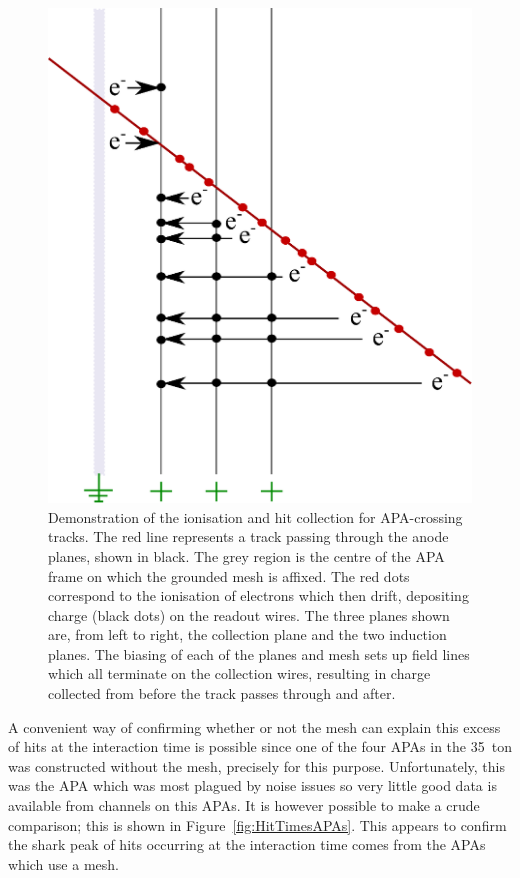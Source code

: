 \begin{figure}
  \centering
  \includegraphics[width=12cm]{MeshHits.eps}
  \caption[Demonstration of the electron ionisation and hit collection for APA-crossing tracks.]{Demonstration of the ionisation and hit collection for APA-crossing tracks.  The red line represents a track passing through the anode planes, shown in black.  The grey region is the centre of the APA frame on which the grounded mesh is affixed.  The red dots correspond to the ionisation of electrons which then drift, depositing charge (black dots) on the readout wires.  The three planes shown are, from left to right, the collection plane and the two induction planes.  The biasing of each of the planes and mesh sets up field lines which all terminate on the collection wires, resulting in charge collected from before the track passes through and after.}
  \label{fig:MeshHits}
\end{figure}

A convenient way of confirming whether or not the mesh can explain this excess of hits at the interaction time is possible since one of the four APAs in the 35~ton was constructed without the mesh, precisely for this purpose.  Unfortunately, this was the APA which was most plagued by noise issues so very little good data is available from channels on this APAs.  It is however possible to make a crude comparison; this is shown in Figure~\ref{fig:HitTimesAPAs}.  This appears to confirm the shark peak of hits occurring at the interaction time comes from the APAs which use a mesh.

